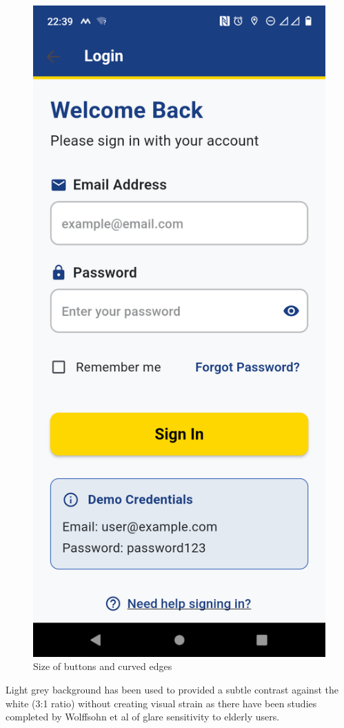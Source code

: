 \documentclass[]{project_final}
\begin{document}
\begin{figure}[ht!]
    \centering
    \includegraphics[height=0.4\textwidth]{M Login screen.png}
    \caption{Size of buttons and curved edges}
    \label{fig:1}
\end{figure}

Light grey background has been used to provided a subtle contrast against the white (3:1 ratio) without creating visual strain as there have been studies completed by Wolffsohn et al of glare sensitivity to elderly users.
\end{document}
